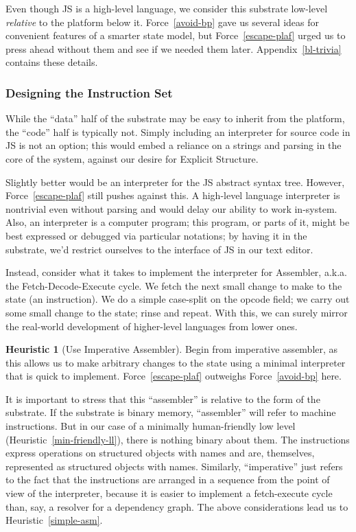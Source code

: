 \documentclass[ twoside,openright,titlepage,numbers=noenddot,headinclude,footinclude,cleardoublepage=empty,abstract=on,
                BCOR=5mm,paper=a4,fontsize=11pt
                ]{scrreprt}
\theoremstyle{definition}
\newtheorem{heuristic}{Heuristic}
\begin{document}
Even though \ac{JS} is a high-level language, we consider this substrate
low-level \emph{relative} to the platform below it. Force~\ref{avoid-bp}
gave us several ideas for convenient features of a smarter state model,
but Force~\ref{escape-plaf} urged us to press ahead without them and see
if we needed them later. Appendix~\ref{bl-trivia} contains these
details.

\hypertarget{designing-the-instruction-set}{\subsubsection{Designing the Instruction
Set}\label{designing-the-instruction-set}}

While the ``data'' half of the substrate may be easy to inherit from the
platform, the ``code'' half is typically not. Simply including an
interpreter for source code in \ac{JS} is not an option; this would
embed a reliance on a strings and parsing in the core of the system,
against our desire for Explicit Structure.

Slightly better would be an interpreter for the \ac{JS} abstract syntax
tree. However, Force~\ref{escape-plaf} still pushes against this. A
high-level language interpreter is nontrivial even without parsing and
would delay our ability to work in-system. Also, an interpreter is a
computer program; this program, or parts of it, might be best expressed
or debugged via particular notations; by having it in the substrate,
we'd restrict ourselves to the interface of \ac{JS} in our text editor.

Instead, consider what it takes to implement the interpreter for
Assembler, a.k.a. the Fetch-Decode-Execute cycle. We fetch the next
small change to make to the state (an instruction). We do a simple
case-split on the opcode field; we carry out some small change to the
state; rinse and repeat. With this, we can surely mirror the real-world
development of higher-level languages from lower ones.

\begin{heuristic}[Use Imperative Assembler]
\label{use-asm}
Begin from imperative assembler, as this allows us to make arbitrary changes to the state using a minimal interpreter that is quick to implement. Force\ \ref{escape-plaf} outweighs Force\ \ref{avoid-bp} here.
\end{heuristic}

It is important to stress that this ``assembler'' is relative to the
form of the substrate. If the substrate is binary memory, ``assembler''
will refer to machine instructions. But in our case of a minimally
human-friendly low level (Heuristic~\ref{min-friendly-ll}), there is
nothing binary about them. The instructions express operations on
structured objects with names and are, themselves, represented as
structured objects with names. Similarly, ``imperative'' just refers to
the fact that the instructions are arranged in a sequence from the point
of view of the interpreter, because it is easier to implement a
fetch-execute cycle than, say, a resolver for a dependency graph. The
above considerations lead us to Heuristic~\ref{simple-asm}.
\end{document}
